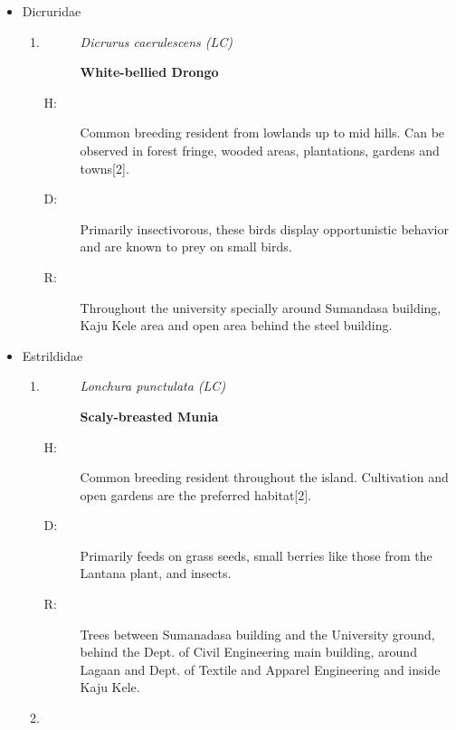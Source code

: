 \begin{itemize}
\begin{enumerate}
\begin{description}
Around the Lagaan, Seetha gangula and Ceremonial courtyard.%
\end{description}%
\end{enumerate}%
\item%
Dicruridae%
\begin{enumerate}%
\item%
\begin{description}%
\item[]%
\textit{Dicrurus caerulescens (LC)}%
\item[]%
\textbf{White{-}bellied Drongo}%
\end{description}%
\begin{description}%
\item[H: ]%
Common breeding resident from lowlands up to mid hills. Can be observed in forest fringe, wooded areas, plantations, gardens and towns{[}2{]}.%
\item[D: ]%
Primarily insectivorous, these birds display opportunistic behavior and are known to prey on small birds.%
\item[R: ]%
Throughout the university specially around Sumandasa building, Kaju Kele area and open area behind the steel building.%
\end{description}%
\end{enumerate}%
\newpage
\item%
Estrildidae%
\begin{enumerate}%
\item%
\begin{description}%
\item[]%
\textit{Lonchura punctulata (LC)}%
\item[]%
\textbf{Scaly{-}breasted Munia}%
\end{description}%
\begin{description}%
\item[H: ]%
Common breeding resident throughout the island. Cultivation and open gardens are the preferred habitat{[}2{]}.%
\item[D: ]%
Primarily feeds on grass seeds, small berries like those from the Lantana plant, and insects.%
\item[R: ]%
Trees between Sumanadasa building and the University ground, behind the Dept. of Civil Engineering main building, around Lagaan and Dept. of Textile and Apparel Engineering and inside Kaju Kele.%
\end{description}%
\item%
\begin{description}%
\item[]%

\end{description}
\end{enumerate}
\end{itemize}

